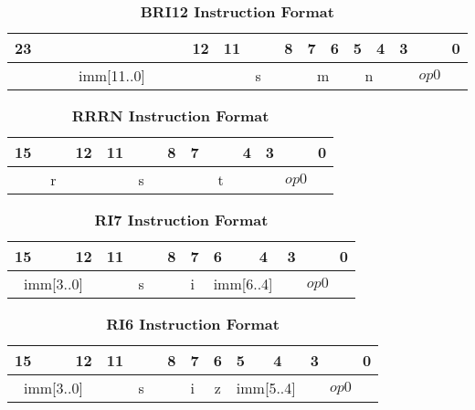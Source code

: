 \begin{table}[H]
    \caption{\textbf{BRI12 Instruction Format}}
    \begin{tabular}{llllllllllllllllllllllll}
        23 & & & & & & & & & & & 12 & 11 & & & 8 & 7 & 6 & 5 & 4 & 3 & & & 0 \\
        \hline
        \multicolumn{12}{|c|}{imm[11..0]} & \multicolumn{4}{c|}{s} & \multicolumn{2}{c|}{m} & \multicolumn{2}{c|}{n} & \multicolumn{4}{c|}{$op0$}\\
        \hline
    \end{tabular}
\end{table}

\begin{table}[H]
    \caption{\textbf{RRRN Instruction Format}}
    \begin{tabular}{llllllllllllllll}
        15 & & & 12 & 11 & & & 8 & 7 &  & & 4 & 3 & & & 0 \\
        \hline
        \multicolumn{4}{|c|}{r} & \multicolumn{4}{c|}{s} & \multicolumn{4}{c|}{t} & \multicolumn{4}{c|}{$op0$}\\
        \hline
    \end{tabular}
\end{table}

\begin{table}[H]
    \caption{\textbf{RI7 Instruction Format}}
    \begin{tabular}{llllllllllllllll}
        15 & & & 12 & 11 & & & 8 & 7 & 6  & & 4 & 3 & & & 0 \\
        \hline
        \multicolumn{4}{|c|}{imm[3..0]} & \multicolumn{4}{c|}{s} & i & \multicolumn{3}{|c|}{imm[6..4]} & \multicolumn{4}{c|}{$op0$}\\
        \hline
    \end{tabular}
\end{table}

\begin{table}[H]
    \caption{\textbf{RI6 Instruction Format}}
    \begin{tabular}{llllllllllllllll}
        15 & & & 12 & 11 & & & 8 & 7 & 6  & 5 & 4 & 3 & & & 0 \\
        \hline
        \multicolumn{4}{|c|}{imm[3..0]} & \multicolumn{4}{c|}{s} & i & \multicolumn{1}{c|}{z} & \multicolumn{2}{c|}{imm[5..4]} & \multicolumn{4}{c|}{$op0$}\\
        \hline
    \end{tabular}
\end{table}